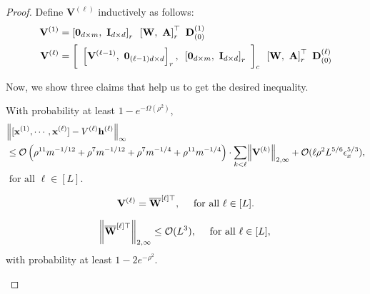 \begin{proof}
	Define $\mathbf{V}^{(\ell)}$ inductively as follows:
	\begin{align*}
		\mathbf{V}^{(1)} &= \left[\mathbf{0}_{d \times m}, \text{ } \mathbf{I}_{d \times d}\right]_r \text{ }  \left[\mathbf{W}, \text{ } \mathbf{A}\right]_r^{\top} \text{ }  \mathbf{D}^{(1)}_{(0)} \\
		\mathbf{V}^{(\ell)} &= \left[\text{ }\left[\mathbf{V}^{(\ell - 1)}, \text{ } \mathbf{0}_{(\ell - 1)d \times d}\right]_r,\text{ } \left[\mathbf{0}_{d \times m},\text{ } \mathbf{I}_{d \times d}\right]_r\text{ }\right]_c  \text{ } \left[\mathbf{W}, \text{ } \mathbf{A}\right]_r^{\top} \text{ }  \mathbf{D}^{(\ell)}_{(0)}
	\end{align*}
	
	Now, we show three claims that help us to get the desired inequality.
	\begin{claim}\label{claim:Vhx}
		With probability at least $1 - e^{-\Omega(\rho^2)}$,
		\begin{align*}
			&\norm{[\mathbf{x}^{(1)}, \cdots, \mathbf{x}^{(\ell)}] - V^{(\ell)} \mathbf{h}^{(\ell)}}_\infty \\&\leq \mathcal{O}\left(\rho^{11} m^{-1/12} + \rho^{7} m^{-1/12} + \rho^{7} m^{-1/4} + \rho^{11} m^{-1/4}  \right)  \cdot \sum_{k 
				< \ell} \norm{\mathbf{V}^{(k)}}_{2, \infty} + \mathcal{O}(\ell \rho^2 L^{5/6} \epsilon_x^{5/3}),  
		\end{align*}
		$\text{ for all } \ell \in [L].$
	\end{claim}
	
	\begin{claim}\label{claim:induct_VW}
		\begin{equation*}
			\mathbf{V}^{(\ell)} = \overline{\mathbf{W}}^{[\ell]\top}, \quad \text{ for all } \ell \in [L].
		\end{equation*}
	\end{claim} 
	
	
	\begin{claim}\label{claim:normWbracketedL}
		\begin{equation*}
			\norm{\overline{\mathbf{W}}^{[\ell]\top}}_{2, \infty} \le \mathcal{O}(L^3), \quad \text{ for all } \ell \in [L],
		\end{equation*}
		with probability at least $1 - 2 e^{-\rho^2}$.
	\end{claim}
	

\end{proof}

